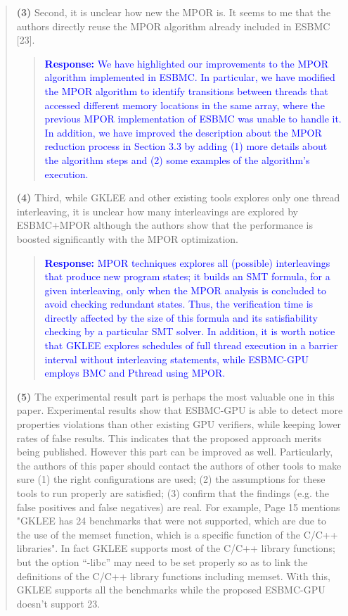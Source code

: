 \documentclass[11pt]{article}
\begin{document}
\begin{quote}
{\bf (3)} Second, it is unclear how new the MPOR is. It seems to me that the authors directly reuse the MPOR algorithm already included in ESBMC [23].

\begin{quote}
\textcolor{blue}{\textbf{Response:} We have highlighted our improvements to the MPOR algorithm implemented in ESBMC. In particular, we have modified the MPOR algorithm to identify transitions between threads that accessed different memory locations in the same array, where the previous MPOR implementation of ESBMC was unable to handle it. In addition, we have improved the description about the MPOR reduction process in Section 3.3 by adding (1) more details about the algorithm steps and (2) some examples of the algorithm's execution.}
\end{quote}

{\bf (4)} Third, while GKLEE and other existing tools explores only one thread interleaving, it is unclear how many interleavings are explored by ESBMC+MPOR although the authors show that the performance is boosted significantly with the MPOR optimization.

\begin{quote}
\textcolor{blue}{\textbf{Response:} MPOR techniques explores all (possible) interleavings that produce new program states; it builds an SMT formula, for a given interleaving, only when the MPOR analysis is concluded to avoid checking redundant states. Thus, the verification time is directly affected by the size of this formula and its satisfiability checking by a particular SMT solver. In addition, it is worth notice that GKLEE explores schedules of full thread execution in a barrier interval without interleaving statements, while ESBMC-GPU employs BMC and Pthread using MPOR.}
\end{quote}

{\bf (5)} The experimental result part is perhaps the most valuable one in this paper. Experimental results show that ESBMC-GPU is able to detect more properties violations than other existing GPU verifiers, while keeping lower rates of false results. This indicates that the proposed approach merits being published. However this part can be improved as well. Particularly, the authors of this paper should contact the authors of other tools to make sure (1) the right configurations are used; (2) the assumptions for these tools to run properly are satisfied; (3) confirm that the findings (e.g. the false positives and false negatives) are real. For example, Page 15 mentions "GKLEE has 24 benchmarks that were not supported, which are due to the use of the memset function, which is a specific function of the C/C++ libraries".
In fact GKLEE supports most of the C/C++ library functions; but the option ``-libc'' may need to be set properly so as to link the definitions of the C/C++ library functions including memset. With this, GKLEE supports all the benchmarks while the proposed ESBMC-GPU doesn't support 23.


\end{quote}
\end{document}
